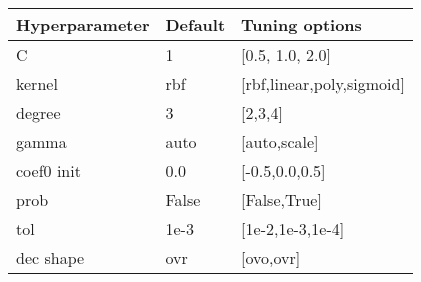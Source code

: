 
\begin{tabular}{|l|l|l|} 
\hline
\textbf{Hyperparameter}& \textbf{Default} & \textbf{Tuning options}\\
\hline
C & 1 & [0.5, 1.0, 2.0] \\
\hline
kernel & rbf & [rbf,linear,poly,sigmoid] \\
\hline
degree & 3 & [2,3,4] \\
\hline
gamma & auto& [auto,scale] \\
\hline
coef0 init & 0.0 & [-0.5,0.0,0.5] \\
\hline
prob & False& [False,True] \\
\hline
tol & 1e-3& [1e-2,1e-3,1e-4] \\
\hline
dec shape & ovr& [ovo,ovr] \\
\hline
\end{tabular}
